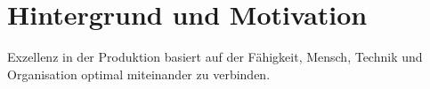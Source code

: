\section{Hintergrund und Motivation}
Exzellenz in der Produktion basiert auf der Fähigkeit, Mensch, Technik und Organisation optimal miteinander zu verbinden.
